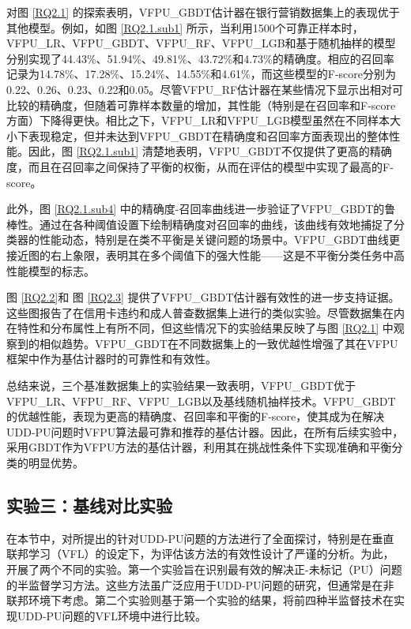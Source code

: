\vspace{-0.35cm}
对图 \ref{RQ2.1} 的探索表明，VFPU\_GBDT估计器在银行营销数据集上的表现优于其他模型。例如，如图 \ref{RQ2.1.sub1} 所示，当利用1500个可靠正样本时，VFPU\_LR、VFPU\_GBDT、VFPU\_RF、VFPU\_LGB和基于随机抽样的模型分别实现了44.43\%、51.94\%、49.81\%、43.72\%和4.73\%的精确度。相应的召回率记录为14.78\%、17.28\%、15.24\%、14.55\%和4.61\%，而这些模型的F-score分别为0.22、0.26、0.23、0.22和0.05。尽管VFPU\_RF估计器在某些情况下显示出相对可比较的精确度，但随着可靠样本数量的增加，其性能（特别是在召回率和F-score方面）下降得更快。相比之下，VFPU\_LR和VFPU\_LGB模型虽然在不同样本大小下表现稳定，但并未达到VFPU\_GBDT在精确度和召回率方面表现出的整体性能。因此，图 \ref{RQ2.1.sub1} 清楚地表明，VFPU\_GBDT不仅提供了更高的精确度，而且在召回率之间保持了平衡的权衡，从而在评估的模型中实现了最高的F-score。

此外，图 \ref{RQ2.1.sub4} 中的精确度-召回率曲线进一步验证了VFPU\_GBDT的鲁棒性。通过在各种阈值设置下绘制精确度对召回率的曲线，该曲线有效地捕捉了分类器的性能动态，特别是在类不平衡是关键问题的场景中。VFPU\_GBDT曲线更接近图的右上象限，表明其在多个阈值下的强大性能——这是不平衡分类任务中高性能模型的标志。

图 \ref{RQ2.2}和 图 \ref{RQ2.3} 提供了VFPU\_GBDT估计器有效性的进一步支持证据。这些图报告了在信用卡违约和成人普查数据集上进行的类似实验。尽管数据集在内在特性和分布属性上有所不同，但这些情况下的实验结果反映了与图 \ref{RQ2.1} 中观察到的相似趋势。VFPU\_GBDT在不同数据集上的一致优越性增强了其在VFPU框架中作为基估计器时的可靠性和有效性。

总结来说，三个基准数据集上的实验结果一致表明，VFPU\_GBDT优于VFPU\_LR、VFPU\_RF、VFPU\_LGB以及基线随机抽样技术。VFPU\_GBDT的优越性能，表现为更高的精确度、召回率和平衡的F-score，使其成为在解决UDD-PU问题时VFPU算法最可靠和推荐的基估计器。因此，在所有后续实验中，采用GBDT作为VFPU方法的基估计器，利用其在挑战性条件下实现准确和平衡分类的明显优势。

\subsection{实验三：基线对比实验}

在本节中，对所提出的针对UDD-PU问题的方法进行了全面探讨，特别是在垂直联邦学习（VFL）的设定下，为评估该方法的有效性设计了严谨的分析。为此，开展了两个不同的实验。第一个实验旨在识别最有效的解决正-未标记（PU）问题的半监督学习方法。这些方法虽广泛应用于UDD-PU问题的研究，但通常是在非联邦环境下考虑。第二个实验则基于第一个实验的结果，将前四种半监督技术在实现UDD-PU问题的VFL环境中进行比较。


